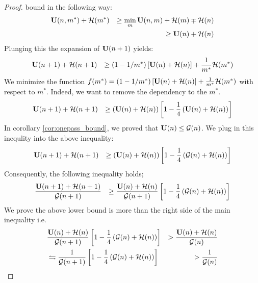 \begin{proof}
bound in the following way: 
\begin{eqnarray*}
	 & \mathbf U(n,m^*) + {\cal H}(m^*) & \geq \min_{m}
	 \mathbf U(n,m) + {\cal H}(m) \mp {\cal H}(n) \\ 
	 & & \geq \mathbf U(n) + {\cal H}(n)
\end{eqnarray*}
Plunging this the expansion of $\mathbf U(n+1)$ yields: 
\begin{eqnarray*}
	& \mathbf U(n+1) + {\cal H}(n+1) & \geq (1-1/m^*)\left[ \mathbf U(n) + {\cal H}(n)\right] +
	\frac{1}{m^*} {\cal H}(m^*) 
\end{eqnarray*}
We minimize the function $f(m^*) =  (1-1/m^*)\left[ \mathbf U(n) +
{\cal H}(n)\right] + \frac{1}{m^*} {\cal H}(m^*) $
with respect to $m^*$. Indeed, we want to remove the dependency to the
$m^*$.
\begin{eqnarray*}
	& \mathbf U(n+1) + {\cal H}(n+1) & \geq \left( \mathbf U(n) + {\cal H}(n)\right) \left[1 -
	\frac{1	}{4} \left( \mathbf U(n) + {\cal H}(n)\right)  \right]
\end{eqnarray*}
In corollary \ref{cor:onepass_bound}, we proved that $\mathbf U(n) \leq {\cal G}(n)$. We plug in
this inequlity into the above inequality: 
\begin{eqnarray*}
	& \mathbf U(n+1) + {\cal H}(n+1) & \geq \left( \mathbf U(n) + {\cal H}(n)\right) \left[1 -
	\frac{1	}{4} \left( {\cal G}(n) + {\cal H}(n)\right)  \right]
\end{eqnarray*}
Consequently, the following inequality holds; 
\begin{eqnarray*}
	& \frac{\mathbf U(n+1) + {\cal H}(n+1)}{{\cal G}(n+1)} & \geq \frac{ \mathbf U(n) +
	{\cal H}(n)}{{\cal G}(n+1)}
	\left[1 - \frac{1	}{4} \left( {\cal G}(n) + {\cal H}(n)\right)  \right]
\end{eqnarray*}
We prove the above lower bound is more than the right side of the main
inequality i.e.
\begin{eqnarray*}
	& \frac{ \mathbf U(n) +
	{\cal H}(n)}{{\cal G}(n+1)}
	\left[1 - \frac{1	}{4} \left( {\cal G}(n) + {\cal H}(n)\right)  \right] & >
	\frac{\mathbf U(n)+{\cal H}(n)}{{\cal G}(n)} \\ 
	& \leftrightharpoons \frac{1}{{\cal G}(n+1)}
	\left[1 - \frac{1	}{4} \left( {\cal G}(n) + {\cal H}(n)\right)  \right] & >
	\frac{1}{{\cal G}(n)}
\end{eqnarray*}
\end{proof}
